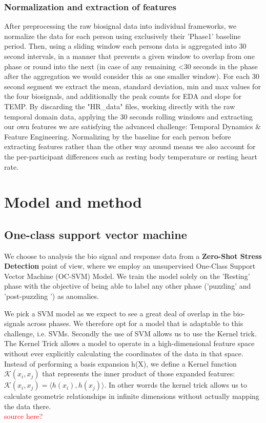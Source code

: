 \documentclass{article}
\begin{document}
\subsubsection*{Normalization and extraction of features}
After preprocessing the raw biosignal data into individual frameworks, we normalize the data for each person using exclusively their 'Phase1' baseline period. Then, using a sliding window each persons data is aggregated into 30 second intervals, in a manner that prevents a given window to overlap from one phase or round into the next (in case of any remaining <30 seconds in the phase after the aggregation we would consider this as one smaller window). For each 30 second segment we extract the mean, standard deviation, min and max values for the four biosignals, and additionally the peak counts for EDA and slope for TEMP. By discarding the "HR\_data" files, working directly with the raw temporal domain data, applying the 30 seconds rolling windows and extracting our own features we are satisfying the advanced challenge: Temporal Dynamics \& Feature Engineering. Normalizing by the baseline for each person before extracting features rather than the other way around means we  also account for the per-participant differences such as resting body temperature or resting heart rate.

\section*{Model and method}
\subsection*{One-class support vector machine}
\noindent
We choose to analysis the bio signal and response data from a \textbf{Zero-Shot Stress Detection} point of view, where we employ an unsupervised One-Class Support Vector Machine (OC-SVM) Model. We train the model solely on the ’Resting’ phase with the objective of being able to label any other phase ('puzzling' and 'post-puzzling ') as anomalies.

We pick a SVM model as we expect to see a great deal of overlap in the bio-signals across phases. We therefore opt for a model that is adaptable to this challenge, i.e. SVMs.
Secondly the use of SVM allows us to use the Kernel trick.  The Kernel Trick allows a model to operate in a high-dimensional feature space without ever explicitly calculating the coordinates of the data in that space. Instead of performing a basis expansion h(X), we define a Kernel function $\mathcal{K}(x_i,x_j)$ that represents the inner product of those expanded features: $\mathcal{K}(x_i,x_j)=\langle h(x_i),h(x_j)\rangle$. 
In other worrds the kernel trick allows us to calculate geometric relationships in infinite dimensions without actually
mapping the data there.\\ \textcolor{red}{source here?}
\end{document}
